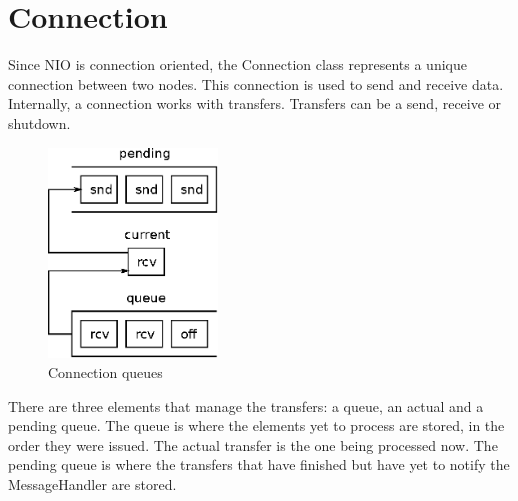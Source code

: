 \documentclass[11pt]{article}
\begin{document}
\section{Connection}
	Since NIO is connection oriented, the Connection class represents a unique connection between two nodes. This connection is used to send and receive data.\\
	Internally, a connection works with transfers. Transfers can be a send, receive or shutdown.
	\begin{figure}[H]
	\centering
	\includegraphics[width=45mm]{img/drawing9.eps}
	\caption[Connection queues]{Connection queues}
	\label{drawing9}
	\end{figure}
	There are three elements that manage the transfers: a queue, an actual and a pending queue. The queue is where the elements yet to process are stored, in the order they were issued. The actual transfer is the one being processed now. The pending queue is where the transfers that have finished but have yet to notify the MessageHandler are stored.
\end{document}
